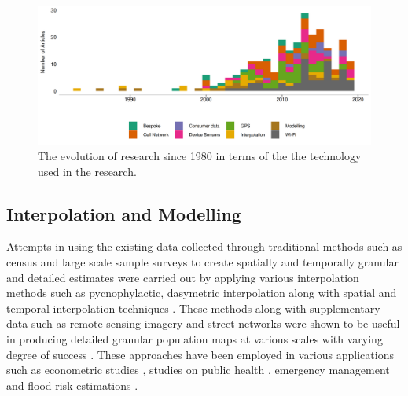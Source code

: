 \begin{figure}
  \includegraphics{images/literature-tech-timeline.png}
  \caption{The evolution of research since 1980 in terms of the the technology used in the research.}
  \label{figure:literature:tech:timeline}
\end{figure}

\subsection{Interpolation and Modelling}

Attempts in using the existing data collected through traditional methods such as census and large scale sample surveys to create spatially and temporally granular and detailed estimates were carried out by applying various interpolation methods such as pycnophylactic, dasymetric interpolation \citep{tobler1979, mennis2003, mennis2006, hawley2005, tapp2010, wismans2017} along with spatial \citep{lam1983,martin1989, martin2015} and temporal interpolation techniques \citep{glickman1986}.
These methods along with supplementary data such as remote sensing imagery \citep{sutton2001, chen2002} and street networks \citep{reibel2005} were shown to be useful in producing detailed granular population maps at various scales with varying degree of success \citep{dobson2000, bhaduri2002, dobson2003, bhaduri2005, bhaduri2007}.
These approaches have been employed in various applications such as econometric studies \citep{mcdonald1989}, studies on public health \citep{hay2005}, emergency management \citep{kwan2005} and flood risk estimations \citep{smith2016}.

